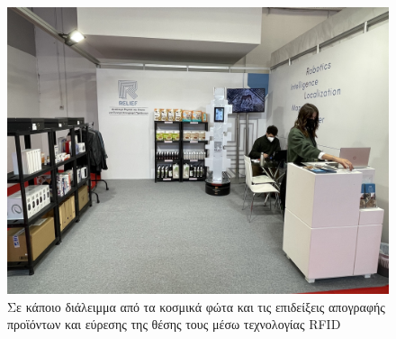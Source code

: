 \begin{figure}[H]\centering
\includegraphics[scale=0.2]{./figures/parts/appendix/chapters/06/beyond_3.jpg}
  \caption{\small Σε κάποιο διάλειμμα από τα κοσμικά φώτα και τις επιδείξεις
           απογραφής προϊόντων και εύρεσης της θέσης τους μέσω τεχνολογίας RFID}
\end{figure}
